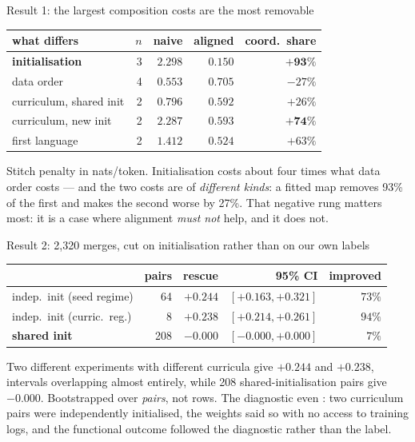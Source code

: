 \documentclass{beamer}
\begin{document}
\begin{frame}{Result 1: the largest composition costs are the most removable}
  \centering
  \begin{tabular}{lrrrr}
    \toprule
    what differs & $n$ & naive & aligned & coord.\ share \\
    \midrule
    \textbf{initialisation}     & 3 & $2.298$ & $\mathbf{0.150}$ & $\mathbf{+93\%}$ \\
    data order                  & 4 & $0.553$ & $0.705$          & $-27\%$ \\
    curriculum, shared init     & 2 & $0.796$ & $0.592$          & $+26\%$ \\
    curriculum, new init        & 2 & $2.287$ & $0.593$          & $\mathbf{+74\%}$ \\
    first language              & 2 & $1.412$ & $0.524$          & $+63\%$ \\
    \bottomrule
  \end{tabular}
  \vfill
  {\footnotesize Stitch penalty in nats/token. Initialisation costs about four times what data
  order costs --- and the two costs are of \emph{different kinds}: a fitted map removes 93\% of the
  first and makes the second \alert{worse} by 27\%. That negative rung matters most: it is a case
  where alignment \emph{must not} help, and it does not.}
\end{frame}

\begin{frame}{Result 2: 2,320 merges, cut on initialisation rather than on our own labels}
  \centering
  \begin{tabular}{lrrrr}
    \toprule
    & pairs & rescue & 95\% CI & improved \\
    \midrule
    indep.\ init (seed regime)   & 64  & $+0.244$ & $[+0.163,+0.321]$ & $73\%$ \\
    indep.\ init (curric.\ reg.) & 8   & $+0.238$ & $[+0.214,+0.261]$ & $94\%$ \\
    \textbf{shared init}         & 208 & $-0.000$ & $[-0.000,+0.000]$ & $7\%$ \\
    \bottomrule
  \end{tabular}
  \vfill
  {\footnotesize Two different experiments with different curricula give $+0.244$ and $+0.238$,
  intervals overlapping almost entirely, while 208 shared-initialisation pairs give $-0.000$.
  Bootstrapped over \emph{pairs}, not rows. The diagnostic even : two curriculum pairs were independently initialised, the weights said so
  with no access to training logs, and the functional outcome followed the diagnostic rather than
  the label.}
\end{frame}
\end{document}
